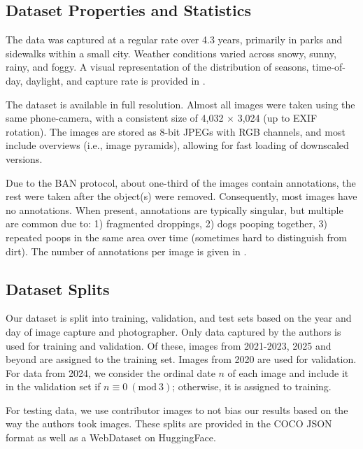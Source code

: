 \subsection{Dataset Properties and Statistics}
\label{subsec:datastat}



The data was captured at a regular rate over 4.3 years, primarily in parks and sidewalks within a small
  city.
Weather conditions varied across snowy, sunny, rainy, and foggy.
A visual representation of the distribution of seasons, time-of-day, daylight, and capture rate is provided
  in .

The dataset is available in full resolution.
Almost all images were taken using the same phone-camera, with a consistent size of 4,032
  $\times$ 3,024 (up to EXIF rotation).
The images are stored as 8-bit JPEGs with RGB channels, and most include overviews (i.e., image pyramids),
  allowing for fast loading of downscaled versions.


Due to the BAN protocol, about one-third of the images contain
annotations, the rest were taken after the object(s) were removed.  Consequently, most
images have no annotations. When present, annotations are typically singular, but
multiple are common due to:
1) fragmented droppings,
2) dogs pooping together,
3) repeated poops in the same area over time (sometimes hard to distinguish from dirt).
The number of annotations per image is given in .


\subsection{Dataset Splits}

Our dataset is split into training, validation, and test sets based on the year and day of image capture and
  photographer.
Only data captured by the authors is used for training and validation.
Of these, images from 2021-2023, 2025 and beyond are assigned to the training set. 
Images from 2020 are used for
  validation.
For data from 2024, we consider the ordinal date $n$ of each image and include it in the validation set if
  $n \equiv 0 \ (\textrm{mod}\ 3)$; otherwise, it is assigned to training.


For testing data, we use contributor images to not bias our results based on the way the authors took
  images.
These splits are provided in the COCO JSON format \cite{lin_microsoft_2014} as well as a WebDataset
  \cite{huggingfacewebdataset} on HuggingFace.
